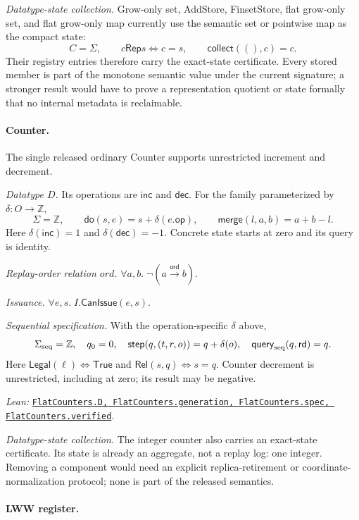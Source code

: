 \documentclass[11pt]{article}
\theoremstyle{definition}
\newcommand{\State}{\Sigma}
\newcommand{\doop}{\mathsf{do}}
\newcommand{\merge}{\mathsf{merge}}
\newcommand{\ord}{\mathrel{\xrightarrow{\mathsf{ord}}}}
\newcommand{\src}[2]{\href{../../#1}{\texttt{#2}}}
\newcommand{\anchor}[2]{\par\smallskip\noindent\emph{Lean: }\src{#1}{#2}.}
\begin{document}
\emph{Datatype-state collection.} Grow-only set, AddStore, FinsetStore, flat grow-only set, and flat grow-only
map currently use the semantic set or pointwise map as the compact state:
\[
 C=\State,\qquad c\mathrel{\mathsf{Rep}}s\Longleftrightarrow c=s,
 \qquad\mathsf{collect}((),c)=c.
\]
Their registry entries therefore carry the exact-state certificate.  Every
stored member is part of the monotone semantic value under the current
signature; a stronger result would have to prove a representation quotient
or state formally that no internal metadata is reclaimable.

\paragraph{Counter.}
The single released ordinary Counter supports unrestricted increment and decrement.

\emph{Datatype $D$.} Its operations are $\mathsf{inc}$ and $\mathsf{dec}$.
For the family parameterized by $\delta:O\to\mathbb Z$,
\[
 \State=\mathbb Z,\qquad
 \doop(s,e)=s+\delta(e.\mathsf{op}),\qquad
 \merge(l,a,b)=a+b-l.
\]
Here $\delta(\mathsf{inc})=1$ and $\delta(\mathsf{dec})=-1$.
Concrete state starts at zero and its query is identity.

\emph{Replay-order relation $ord$.} $\forall a,b.\;\neg(a\ord b)$.

\emph{Issuance.} $\forall e,s.\;I.\mathsf{CanIssue}(e,s)$.

\emph{Sequential specification.} With the operation-specific $\delta$ above,
\[
 \Sigma_{\rm seq}=\mathbb Z,\quad q_0=0,\quad
 \mathsf{step}(q,(t,r,o))=q+\delta(o),\quad
 \mathsf{query}_{\rm seq}(q,\mathsf{rd})=q.
\]
Here $\mathsf{Legal}(\ell)\Longleftrightarrow\mathsf{True}$ and
$\mathsf{Rel}(s,q)\Longleftrightarrow s=q$. Counter decrement is
unrestricted, including at zero; its result may be negative.
\anchor{Sal/MRDTs/Instances/FlatCounters.lean}
  {FlatCounters.D, FlatCounters.generation, FlatCounters.spec,
   FlatCounters.verified}

\emph{Datatype-state collection.} The integer counter
also carries an exact-state certificate. Its state is already an aggregate,
not a replay log: one integer.  Removing a component would
need an explicit replica-retirement or coordinate-normalization protocol;
none is part of the released semantics.

\paragraph{LWW register.}
\end{document}
